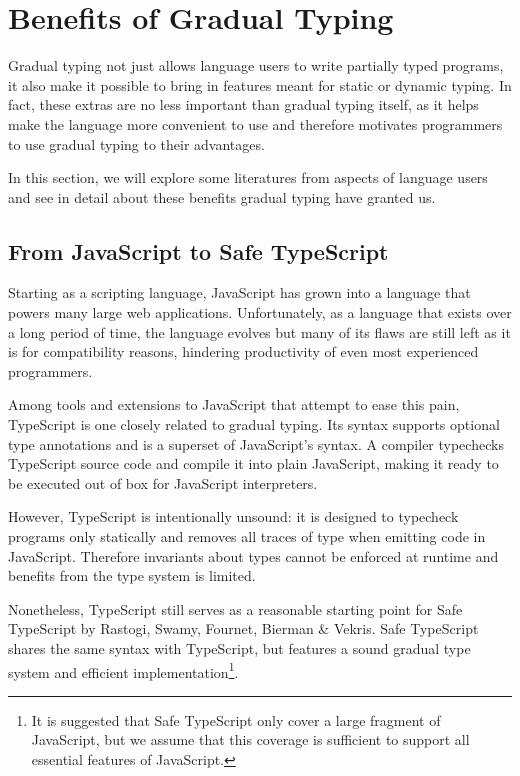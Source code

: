 
\section{Benefits of Gradual Typing}

Gradual typing not just allows language users to write partially typed programs,
it also make it possible to bring in features meant for static or dynamic typing.
In fact, these extras are no less important than gradual typing itself,
as it helps make the language more convenient to use
and therefore motivates programmers to use gradual typing to their advantages.

In this section, we will explore some literatures
from aspects of language users and see in detail about these benefits
gradual typing have granted us.

\subsection{From JavaScript to Safe TypeScript}

Starting as a scripting language,
JavaScript has grown into a language that powers many large web applications.
Unfortunately, as a language that exists over a long period of time,
the language evolves but many of its flaws are still left as it is for compatibility reasons,
hindering productivity of even most experienced programmers.

Among tools and extensions to JavaScript that attempt to ease this pain,
TypeScript is one closely related to gradual typing.
Its syntax supports optional type annotations\cite{bierman2014understanding}
and is a superset of JavaScript's syntax.
A compiler typechecks TypeScript source code
and compile it into plain JavaScript,
making it ready to be executed out of box for JavaScript interpreters.

However, TypeScript is intentionally unsound:
it is designed to typecheck programs only statically
and removes all traces of type when emitting code in JavaScript.
Therefore invariants about types cannot be enforced at runtime
 and benefits from the type system is limited.

Nonetheless, TypeScript still serves as a reasonable starting point
for Safe TypeScript by Rastogi, Swamy, Fournet, Bierman \& Vekris\cite{rastogi2015safe}.
Safe TypeScript shares the same syntax with TypeScript,
but features a sound gradual type system and efficient implementation\footnote{It is suggested
that Safe TypeScript only cover a large fragment of JavaScript, but we assume that this coverage
is sufficient to support all essential features of JavaScript.
}.

